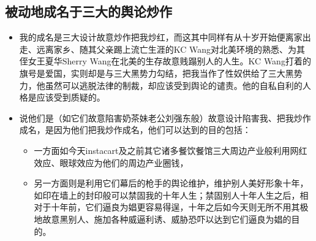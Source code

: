 \documentclass[9pt, b5paper]{article}
\begin{document}
\subsection{被动地成名于三大的舆论炒作}
\label{sec-7-1}
\begin{itemize}
\item 我的成名是三大设计故意炒作把我炒红，而这其中同样有从十岁开始便离家出走、远离家乡、随其父亲踢上流亡生涯的KC Wang对北美环境的熟悉、为其侄女王夏华Sherry Wang在北美的生存故意贱蹋别人的人生。KC Wang打着的旗号是爱国，实则却是与三大黑势力勾结，把我当作了性奴供给了三大黑势力，他虽然可以逃脱法律的制裁，却应该受到舆论的谴责。他的自私自利的人格是应该受到质疑的。
\item 说他们是（如它们故意陷害奶茶妹老公刘强东般）故意设计陷害我、把我炒作成名，是因为他们把我炒作成名，他们可以达到的目的包括：
\begin{itemize}
\item 一方面如今天instacart及之前其它诸多餐饮餐馆三大周边产业般利用网红效应、眼球效应为他们的周边产业圈钱，
\item 另一方面则是利用它们幕后的枪手的舆论维护，维护别人美好形象十年，如印在墙上的封印般可以禁固我的十年人生；禁固别人十年人生之后，相对于十年前，它们逼良为娼更容易得逞，十年之后如今天则无所不用其极地故意黑别人、施加各种威逼利诱、威胁恐吓以达到它们逼良为娼的目的。
\end{itemize}
\end{itemize}
\end{document}
